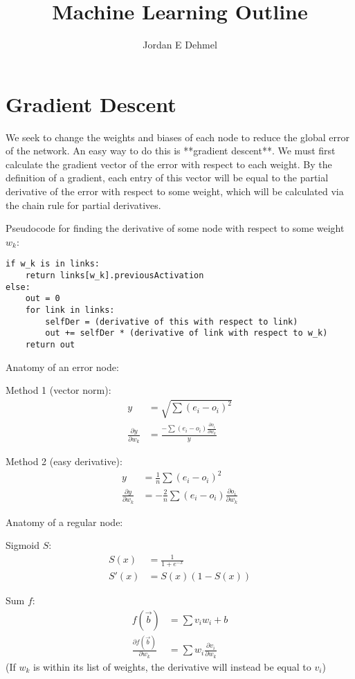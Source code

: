 \documentclass[8pt]{amsart}
\title{Machine Learning Outline}
\author{Jordan E Dehmel}
\begin{document}
\maketitle

\section{Gradient Descent}

We seek to change the weights and biases of each node to reduce the
global error of the network. An easy way to do this is **gradient descent**.
We must first calculate the gradient vector of the error with respect to
each weight. By the definition of a gradient, each entry of this vector will
be equal to the partial derivative of the error with respect to some weight,
which will be calculated via the chain rule for partial derivatives.

Pseudocode for finding the derivative of some node with respect to
some weight $w_k$:
\begin{verbatim}
if w_k is in links:
    return links[w_k].previousActivation
else:
    out = 0
    for link in links:
        selfDer = (derivative of this with respect to link)
        out += selfDer * (derivative of link with respect to w_k)
    return out
\end{verbatim}

Anatomy of an error node:

Method 1 (vector norm):
$$
\begin{aligned}
    y &= \sqrt{\sum{(e_i - o_i)^2}} \\
    \frac{\partial y}{\partial w_k} &= \frac{-\sum{(e_i - o_i)\frac{\partial o_i}{\partial w_k}}}{y}
\end{aligned}
$$

Method 2 (easy derivative):
$$
\begin{aligned}
    y &= \frac{1}{n} \sum{(e_i - o_i)^2} \\
    \frac{\partial y}{\partial w_k} &= - \frac{2}{n} \sum{(e_i - o_i) \frac{\partial o_i}{\partial w_k}}
\end{aligned}
$$

Anatomy of a regular node:

Sigmoid $S$:
$$
\begin{aligned}
    S(x) &= \frac{1}{1 + e^{-x}} \\
    S'(x) &= S(x) (1 - S(x))
\end{aligned}
$$

Sum $f$:
$$
\begin{aligned}
    f(\vec{b}) &= \sum{v_i w_i} + b \\
    \frac{\partial f(\vec{b})}{\partial w_k} &= \sum{w_i \frac{\partial v_i}{\partial w_k}}
\end{aligned}
$$
(If $w_k$ is within its list of weights, the derivative will instead be equal to $v_i$)
\end{document}
